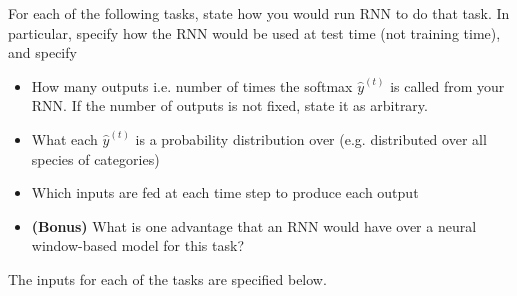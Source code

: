 \documentclass{assignment format}
\begin{document}
For each of the following tasks, state how you would run RNN to do that task. In particular, specify how the RNN would be used at test time (not training time), and specify
\begin{itemize}
    \item How many outputs i.e. number of times the softmax $\hat{y}^{(t)}$ is called from your RNN. If the number of outputs is not fixed, state it as arbitrary.  
    \item What each $\hat{y}^{(t)}$ is a probability distribution over (e.g. distributed over all species of categories)
    \item Which inputs are fed at each time step to produce each output
    \item \textbf{(Bonus) }What is one advantage that an RNN would have over a neural window-based model for this task?
    \end{itemize}
The inputs for each of the tasks are specified below.
\end{document}
